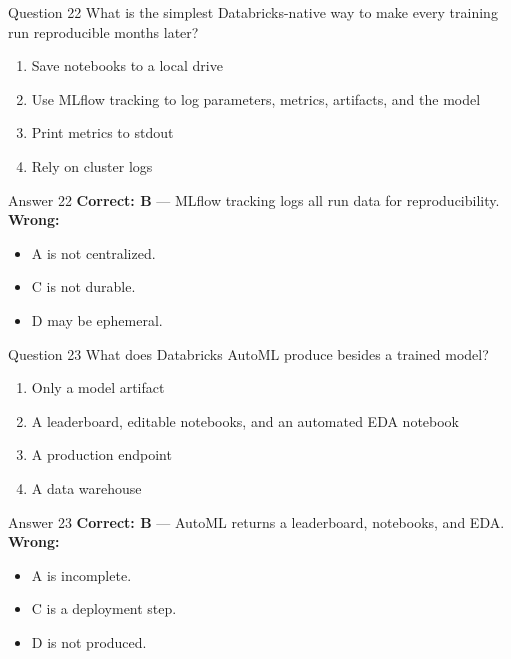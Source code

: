 \documentclass[aspectratio=169,11pt]{beamer}
\begin{document}
	\begin{frame}{Question 22}
		What is the simplest Databricks-native way to make every training run reproducible months later?
		\begin{enumerate}[label=\Alph*.]
			\item Save notebooks to a local drive
			\item Use MLflow tracking to log parameters, metrics, artifacts, and the model
			\item Print metrics to stdout
			\item Rely on cluster logs
		\end{enumerate}
	\end{frame}
	\begin{frame}{Answer 22}
		\textbf{Correct: B} --- MLflow tracking logs all run data for reproducibility.\\
		\vspace{0.5em}
		\textbf{Wrong:}
		\begin{itemize}
			\item A is not centralized.
			\item C is not durable.
			\item D may be ephemeral.
		\end{itemize}
	\end{frame}
	
	\begin{frame}{Question 23}
		What does Databricks AutoML produce besides a trained model?
		\begin{enumerate}[label=\Alph*.]
			\item Only a model artifact
			\item A leaderboard, editable notebooks, and an automated EDA notebook
			\item A production endpoint
			\item A data warehouse
		\end{enumerate}
	\end{frame}
	\begin{frame}{Answer 23}
		\textbf{Correct: B} --- AutoML returns a leaderboard, notebooks, and EDA.\\
		\vspace{0.5em}
		\textbf{Wrong:}
		\begin{itemize}
			\item A is incomplete.
			\item C is a deployment step.
			\item D is not produced.
		\end{itemize}
	\end{frame}
	
\end{document}
